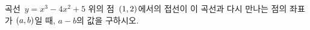 곡선~$y=x^3-4x^2+5$ 위의 점~$(1{,}\mkern3mu\mathopen{}2)$에서의 접선이 이 곡선과 다시 만나는 점의 좌표가 $(a{,}\mkern3mu\mathopen{}b)$일 때, $a-b$의 값을 구하시오.
